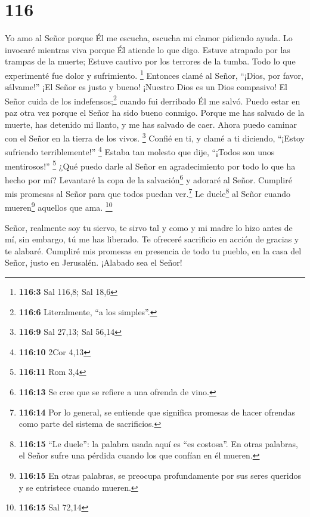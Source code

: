 \hypertarget{section-115}{%
\section{116}\label{section-115}}

 Yo amo al Señor porque Él me escucha, escucha mi clamor
pidiendo ayuda.  Lo invocaré mientras viva porque Él
atiende lo que digo.  Estuve atrapado por las trampas de
la muerte; Estuve cautivo por los terrores de la tumba. Todo lo que
experimenté fue dolor y sufrimiento. \footnote{\textbf{116:3} Sal 116,8;
  Sal 18,6}  Entonces clamé al Señor, ``¡Dios, por favor,
sálvame!''  ¡El Señor es justo y bueno! ¡Nuestro Dios es
un Dios compasivo!  El Señor cuida de los
indefensos;\footnote{\textbf{116:6} Literalmente, ``a los simples''.}
cuando fui derribado Él me salvó.  Puedo estar en paz otra
vez porque el Señor ha sido bueno conmigo.  Porque me has
salvado de la muerte, has detenido mi llanto, y me has salvado de caer.
 Ahora puedo caminar con el Señor en la tierra de los
vivos. \footnote{\textbf{116:9} Sal 27,13; Sal 56,14} 
Confié en ti, y clamé a ti diciendo, ``¡Estoy sufriendo terriblemente!''
\footnote{\textbf{116:10} 2Cor 4,13}  Estaba tan molesto
que dije, ``¡Todos son unos mentirosos!'' \footnote{\textbf{116:11} Rom
  3,4}  ¿Qué puedo darle al Señor en agradecimiento por
todo lo que ha hecho por mí?  Levantaré la copa de la
salvación\footnote{\textbf{116:13} Se cree que se refiere a una ofrenda
  de vino.} y adoraré al Señor.  Cumpliré mis promesas al
Señor para que todos puedan ver.\footnote{\textbf{116:14} Por lo
  general, se entiende que significa promesas de hacer ofrendas como
  parte del sistema de sacrificios.}  Le duele\footnote{\textbf{116:15}
  ``Le duele'': la palabra usada aquí es ``es costosa''. En otras
  palabras, el Señor sufre una pérdida cuando los que confían en él
  mueren.} al Señor cuando mueren\footnote{\textbf{116:15} En otras
  palabras, se preocupa profundamente por sus seres queridos y se
  entristece cuando mueren.} aquellos que ama. \footnote{\textbf{116:15}
  Sal 72,14}

 Señor, realmente soy tu siervo, te sirvo tal y como y mi
madre lo hizo antes de mí, sin embargo, tú me has liberado.
 Te ofreceré sacrificio en acción de gracias y te
alabaré.  Cumpliré mis promesas en presencia de todo tu
pueblo,  en la casa del Señor, justo en Jerusalén.
¡Alabado sea el Señor!

